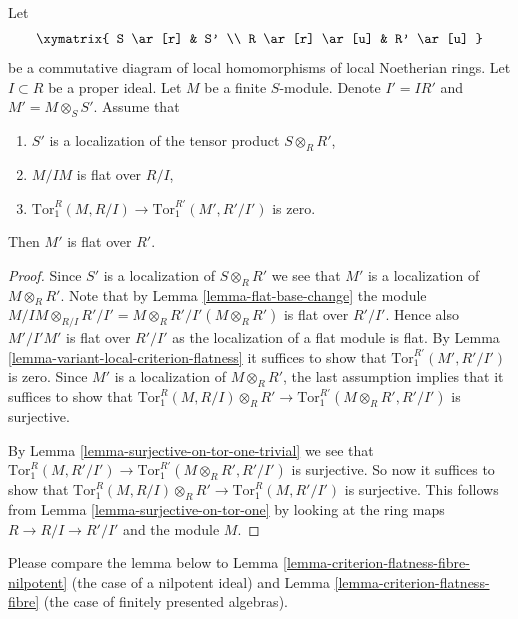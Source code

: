 \begin{lemma}
\label{lemma-another-variant-local-criterion-flatness}
Let
$$
\xymatrix{
S \ar[r] & S' \\
R \ar[r] \ar[u] & R' \ar[u]
}
$$
be a commutative diagram of local homomorphisms of local Noetherian rings.
Let $I \subset R$ be a proper ideal.
Let $M$ be a finite $S$-module.
Denote $I' = IR'$ and $M' = M \otimes_S S'$.
Assume that
\begin{enumerate}
\item $S'$ is a localization of the tensor product
$S \otimes_R R'$,
\item $M/IM$ is flat over $R/I$,
\item $\text{Tor}_1^R(M, R/I) \to \text{Tor}_1^{R'}(M', R'/I')$
is zero.
\end{enumerate}
Then $M'$ is flat over $R'$.
\end{lemma}

\begin{proof}
Since $S'$ is a localization of $S \otimes_R R'$ we see that
$M'$ is a localization of $M \otimes_R R'$. Note that
by Lemma \ref{lemma-flat-base-change} the module $M/IM \otimes_{R/I} R'/I'
= M \otimes_R R' /I'(M \otimes_R R')$ is flat over $R'/I'$. Hence also
$M'/I'M'$ is flat over $R'/I'$ as the localization of a flat module
is flat. By Lemma \ref{lemma-variant-local-criterion-flatness}
it suffices to show that $\text{Tor}_1^{R'}(M', R'/I')$ is zero.
Since $M'$ is a localization of $M \otimes_R R'$, the last assumption
implies that it suffices to show that
$\text{Tor}_1^R(M, R/I) \otimes_R R'
\to
\text{Tor}_1^{R'}(M \otimes_R R', R'/I')$
is surjective.

\medskip\noindent
By Lemma \ref{lemma-surjective-on-tor-one-trivial} we see that
$\text{Tor}_1^R(M, R'/I') \to \text{Tor}_1^{R'}(M \otimes_R R', R'/I')$
is surjective. So now it suffices to show that
$\text{Tor}_1^R(M, R/I) \otimes_R R'
\to
\text{Tor}_1^R(M, R'/I')$
is surjective. This follows from Lemma \ref{lemma-surjective-on-tor-one}
by looking at the ring maps $R \to R/I \to R'/I'$ and the module $M$.
\end{proof}

\noindent
Please compare the lemma below to
Lemma \ref{lemma-criterion-flatness-fibre-nilpotent}
(the case of a nilpotent ideal) and
Lemma \ref{lemma-criterion-flatness-fibre}
(the case of finitely presented algebras).

